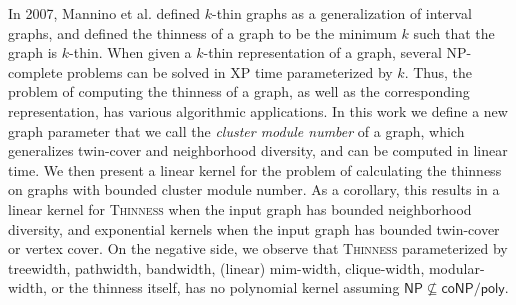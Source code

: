 \documentclass[12pt]{article}
\newcommand{\XP}{\textsf{\textup{XP}} }
\newcommand{\NP}{\textsf{\textup{NP}}}
\begin{document}
In 2007, Mannino et al. defined $k$-thin graphs as a generalization of interval graphs, and defined the thinness of a graph to be the minimum $k$ such that the graph is $k$-thin. When given a $k$-thin representation of a graph, several \NP-complete problems can be solved in \XP time parameterized by $k$. Thus, the problem of computing the thinness of a graph, as well as the corresponding representation, has various algorithmic applications. In this work we define a new graph parameter that we call the {\em cluster module number} of a graph, which generalizes twin-cover and neighborhood diversity, and can be computed in linear time. We then present a linear kernel for the problem of calculating the thinness on graphs with bounded cluster module number. As a corollary, this results in a linear kernel for \textsc{Thinness} when the input graph has bounded neighborhood diversity, and exponential kernels when the input graph has bounded twin-cover or vertex cover. On the negative side, we observe that  \textsc{Thinness} parameterized by treewidth, pathwidth, bandwidth, (linear) mim-width, clique-width, modular-width, or the thinness itself, has no polynomial kernel assuming $\textsf{NP} \not\subseteq \textsf{coNP} / \textsf{poly}$.





\end{document}
